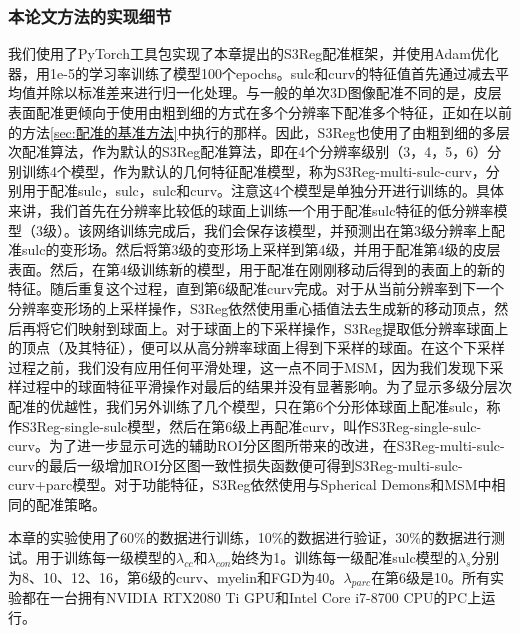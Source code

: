 \subsubsection{本论文方法的实现细节}
我们使用了PyTorch\cite{paszke2017automatic}工具包实现了本章提出的S3Reg配准框架，并使用Adam优化器\cite{kingma2014adam}，用1e-5的学习率训练了模型100个epochs。sulc和curv的特征值首先通过减去平均值并除以标准差来进行归一化处理。与一般的单次3D图像配准不同的是，皮层表面配准更倾向于使用由粗到细的方式在多个分辨率下配准多个特征，正如在以前的方法\ref{sec:配准的基准方法}中执行的那样。因此，S3Reg也使用了由粗到细的多层次配准算法，作为默认的S3Reg配准算法，即在4个分辨率级别（3，4，5，6）分别训练4个模型，作为默认的几何特征配准模型，称为S3Reg-multi-sulc-curv，分别用于配准sulc，sulc，sulc和curv。注意这4个模型是单独分开进行训练的。具体来讲，我们首先在分辨率比较低的球面上训练一个用于配准sulc特征的低分辨率模型（3级）。该网络训练完成后，我们会保存该模型，并预测出在第3级分辨率上配准sulc的变形场。然后将第3级的变形场上采样到第4级，并用于配准第4级的皮层表面。然后，在第4级训练新的模型，用于配准在刚刚移动后得到的表面上的新的特征。随后重复这个过程，直到第6级配准curv完成。对于从当前分辨率到下一个分辨率变形场的上采样操作，S3Reg依然使用重心插值法去生成新的移动顶点，然后再将它们映射到球面上。对于球面上的下采样操作，S3Reg提取低分辨率球面上的顶点（及其特征），便可以从高分辨率球面上得到下采样的球面。在这个下采样过程之前，我们没有应用任何平滑处理，这一点不同于MSM\cite{robinson2014msm}，因为我们发现下采样过程中的球面特征平滑操作对最后的结果并没有显著影响。为了显示多级分层次配准的优越性，我们另外训练了几个模型，只在第6个分形体球面上配准sulc，称作S3Reg-single-sulc模型，然后在第6级上再配准curv，叫作S3Reg-single-sulc-curv。为了进一步显示可选的辅助ROI分区图所带来的改进，在S3Reg-multi-sulc-curv的最后一级增加ROI分区图一致性损失函数便可得到S3Reg-multi-sulc-curv+parc模型。对于功能特征，S3Reg依然使用与Spherical Demons和MSM中相同的配准策略。

本章的实验使用了60\%的数据进行训练，10\%的数据进行验证，30\%的数据进行测试。用于训练每一级模型的$\lambda_{cc}$和$\lambda_{con}$始终为1。训练每一级配准sulc模型的$\lambda_s$分别为8、10、12、16，第6级的curv、myelin和FGD为40。$\lambda_{parc}$在第6级是10。所有实验都在一台拥有NVIDIA RTX2080 Ti GPU和Intel Core i7-8700 CPU的PC上运行。


